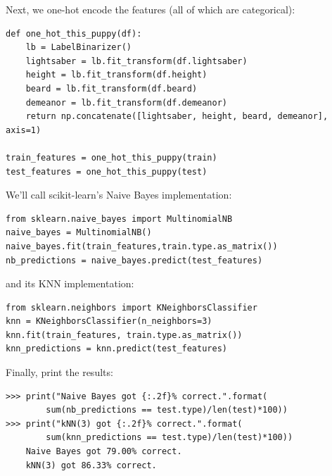 \vspace{-.05in}
Next, we one-hot encode the features (all of which are categorical):
\vspace{-.1in}
\begin{Verbatim}[fontsize=\footnotesize,samepage=true,frame=single]
def one_hot_this_puppy(df):
    lb = LabelBinarizer()
    lightsaber = lb.fit_transform(df.lightsaber)
    height = lb.fit_transform(df.height)
    beard = lb.fit_transform(df.beard)
    demeanor = lb.fit_transform(df.demeanor)
    return np.concatenate([lightsaber, height, beard, demeanor], axis=1)

train_features = one_hot_this_puppy(train)
test_features = one_hot_this_puppy(test)
\end{Verbatim}
\normalsize

\vspace{-.05in}
We'll call scikit-learn's Naive Bayes implementation:
\vspace{-.15in}

\begin{Verbatim}[fontsize=\footnotesize,samepage=true,frame=single]
from sklearn.naive_bayes import MultinomialNB
naive_bayes = MultinomialNB()
naive_bayes.fit(train_features,train.type.as_matrix())
nb_predictions = naive_bayes.predict(test_features)
\end{Verbatim}
\normalsize

\vspace{-.05in}
and its KNN implementation:
\vspace{-.15in}

\begin{Verbatim}[fontsize=\footnotesize,samepage=true,frame=single]
from sklearn.neighbors import KNeighborsClassifier
knn = KNeighborsClassifier(n_neighbors=3)
knn.fit(train_features, train.type.as_matrix())
knn_predictions = knn.predict(test_features)
\end{Verbatim}
\normalsize

\vspace{-.05in}
Finally, print the results:
\vspace{-.15in}

\begin{Verbatim}[fontsize=\footnotesize,samepage=true,frame=single]
>>> print("Naive Bayes got {:.2f}% correct.".format(
        sum(nb_predictions == test.type)/len(test)*100))
>>> print("kNN(3) got {:.2f}% correct.".format(
        sum(knn_predictions == test.type)/len(test)*100))
    Naive Bayes got 79.00% correct.
    kNN(3) got 86.33% correct.
\end{Verbatim}
\normalsize

